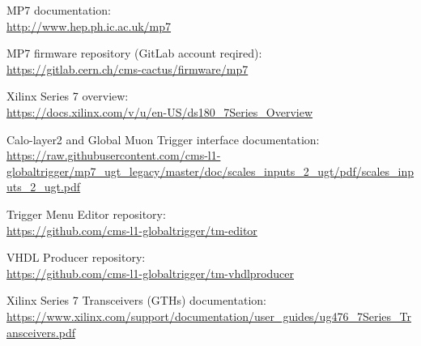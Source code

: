 \documentclass[11pt,a4paper,english,titlepage]{article}
\begin{document}
    \doctitlepage{}

    

    \doctoc{}

    
    
    
    
    
    
    
    

    \doctables{}

    \docfigures{}


    \clearpage

    \begin{thebibliography}{00}

    MP7 documentation:\\
    \url{http://www.hep.ph.ic.ac.uk/mp7}

    MP7 firmware repository (GitLab account reqired):\\
    \url{https://gitlab.cern.ch/cms-cactus/firmware/mp7}

    Xilinx Series 7 overview:\\
    \url{https://docs.xilinx.com/v/u/en-US/ds180_7Series_Overview}

    Calo-layer2 and Global Muon Trigger interface documentation:\\
    \url{https://raw.githubusercontent.com/cms-l1-globaltrigger/mp7_ugt_legacy/master/doc/scales_inputs_2_ugt/pdf/scales_inputs_2_ugt.pdf}

    Trigger Menu Editor repository:\\
    \url{https://github.com/cms-l1-globaltrigger/tm-editor}

    VHDL Producer repository:\\
    \url{https://github.com/cms-l1-globaltrigger/tm-vhdlproducer}

    Xilinx Series 7 Transceivers (GTHs) documentation:\\
    \url{https://www.xilinx.com/support/documentation/user_guides/ug476_7Series_Transceivers.pdf}

    \end{thebibliography}

\end{document}
